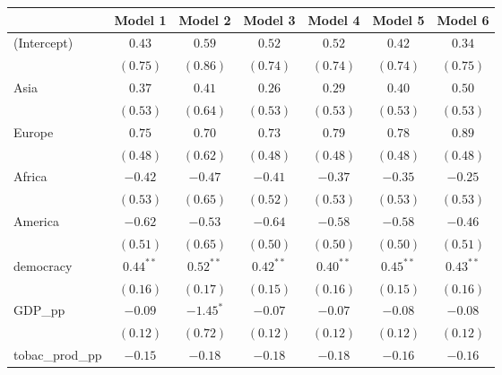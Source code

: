
\begin{table}[!h]
\begin{center}
\begin{tabular}{l c c c c c c }
\toprule
 & Model 1 & Model 2 & Model 3 & Model 4 & Model 5 & Model 6 \\
\midrule
(Intercept)             & $0.43$       & $0.59$       & $0.52$       & $0.52$       & $0.42$       & $0.34$       \\
                        & $(0.75)$     & $(0.86)$     & $(0.74)$     & $(0.74)$     & $(0.74)$     & $(0.75)$     \\
Asia                    & $0.37$       & $0.41$       & $0.26$       & $0.29$       & $0.40$       & $0.50$       \\
                        & $(0.53)$     & $(0.64)$     & $(0.53)$     & $(0.53)$     & $(0.53)$     & $(0.53)$     \\
Europe                  & $0.75$       & $0.70$       & $0.73$       & $0.79$       & $0.78$       & $0.89$       \\
                        & $(0.48)$     & $(0.62)$     & $(0.48)$     & $(0.48)$     & $(0.48)$     & $(0.48)$     \\
Africa                  & $-0.42$      & $-0.47$      & $-0.41$      & $-0.37$      & $-0.35$      & $-0.25$      \\
                        & $(0.53)$     & $(0.65)$     & $(0.52)$     & $(0.53)$     & $(0.53)$     & $(0.53)$     \\
America                 & $-0.62$      & $-0.53$      & $-0.64$      & $-0.58$      & $-0.58$      & $-0.46$      \\
                        & $(0.51)$     & $(0.65)$     & $(0.50)$     & $(0.50)$     & $(0.50)$     & $(0.51)$     \\
democracy               & $0.44^{**}$  & $0.52^{**}$  & $0.42^{**}$  & $0.40^{**}$  & $0.45^{**}$  & $0.43^{**}$  \\
                        & $(0.16)$     & $(0.17)$     & $(0.15)$     & $(0.16)$     & $(0.15)$     & $(0.16)$     \\
GDP\_pp                 & $-0.09$      & $-1.45^{*}$  & $-0.07$      & $-0.07$      & $-0.08$      & $-0.08$      \\
                        & $(0.12)$     & $(0.72)$     & $(0.12)$     & $(0.12)$     & $(0.12)$     & $(0.12)$     \\
tobac\_prod\_pp         & $-0.15$      & $-0.18$      & $-0.18$      & $-0.18$      & $-0.16$      & $-0.16$      \\

\end{tabular}
\end{center}
\end{table}
